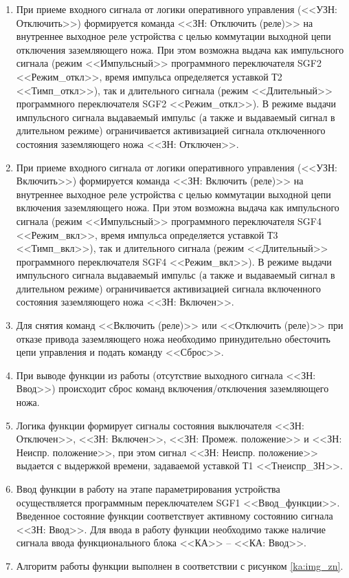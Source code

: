 \begin{enumerate}
\begin{enumerate}
\item
При приеме входного сигнала от логики оперативного управления (<<УЗН: Отключить>>) формируется команда <<ЗН: Отключить (реле)>> на внутреннее выходное реле устройства с целью коммутации выходной цепи отключения заземляющего ножа. При этом возможна выдача как импульсного сигнала (режим <<Импульсный>> программного переключателя SGF2 <<Режим\_откл>>, время импульса определяется уставкой Т2 <<Тимп\_откл>>), так и длительного сигнала (режим <<Длительный>> программного переключателя SGF2 <<Режим\_откл>>). 
В режиме выдачи импульсного сигнала выдаваемый импульс (а также и выдаваемый сигнал в длительном режиме) ограничивается активизацией сигнала отключенного состояния заземляющего ножа <<ЗН: Отключен>>.
\item
При приеме входного сигнала от логики оперативного управления (<<УЗН: Включить>>) формируется команда <<ЗН: Включить (реле)>> на внутреннее выходное реле устройства с целью коммутации выходной цепи включения заземляющего ножа. При этом возможна выдача как импульсного сигнала (режим <<Импульсный>> программного переключателя SGF4 <<Режим\_вкл>>, время импульса определяется уставкой Т3 <<Тимп\_вкл>>), так и длительного сигнала (режим <<Длительный>> программного переключателя SGF4 <<Режим\_вкл>>).
В режиме выдачи импульсного сигнала выдаваемый импульс (а также и выдаваемый сигнал в длительном режиме) ограничивается активизацией сигнала включенного состояния заземляющего ножа <<ЗН: Включен>>.
\item
Для снятия команд <<Включить (реле)>> или <<Отключить (реле)>> при отказе привода заземляющего ножа необходимо принудительно обесточить цепи управления и подать команду <<Сброс>>.
\item
При выводе функции из работы (отсутствие выходного сигнала <<ЗН: Ввод>>) происходит сброс команд включения/отключения заземляющего ножа.

\item
Логика функции формирует сигналы состояния выключателя <<ЗН: Отключен>>, <<ЗН: Включен>>, <<ЗН: Промеж. положение>> и <<ЗН: Неиспр. положение>>, при этом сигнал <<ЗН: Неиспр. положение>> выдается с выдержкой времени, задаваемой уставкой Т1 <<Тнеиспр\_ЗН>>.

\item
Ввод функции в работу на этапе параметрирования устройства осуществляется программным переключателем SGF1 <<Ввод\_функции>>. Введенное состояние функции соответствует активному состоянию сигнала <<ЗН: Ввод>>. Для ввода в работу функции необходимо также наличие сигнала ввода функционального блока <<КА>> -- <<КА: Ввод>>.
\item
Алгоритм работы функции выполнен в соответствии с рисунком \ref{ka:img_zn}. 



\end{enumerate}
\end{enumerate}
